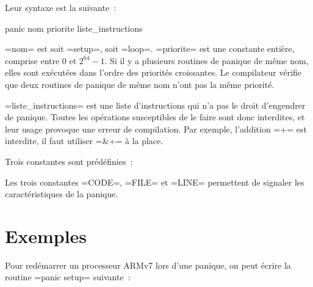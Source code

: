 Leur syntaxe est la suivante~:
\begin{PLM}
panic nom priorite {
  liste_instructions
}
\end{PLM}

\plm=nom= est soit \plm=setup=, soit \plm=loop=. \plm=priorite= est une constante entière, comprise entre $0$ et $2^{64}-1$. Si il y a plusieurs routines de panique de même nom, elles sont exécutées dans l'ordre des priorités croissantes. Le compilateur vérifie que deux routines de panique de même nom n'ont pas la même priorité.

\plm=liste_instructions= est une liste d'instructions qui n'a pas le droit d'engendrer de panique. Toutes les opérations susceptibles de le faire sont donc interdites, et leur usage provoque une erreur de compilation. Par exemple, l'addition \plm=+= est interdite, il faut utiliser \plm=&+= à la place.

Trois constantes sont prédéfinies~:

Les trois constantes \plm=CODE=, \plm=FILE= et \plm=LINE= permettent de signaler les caractéristiques de la panique.


\section{Exemples}

Pour redémarrer un processeur ARMv7 lors d'une panique, on peut écrire la routine \plm=panic setup= suivante~:
